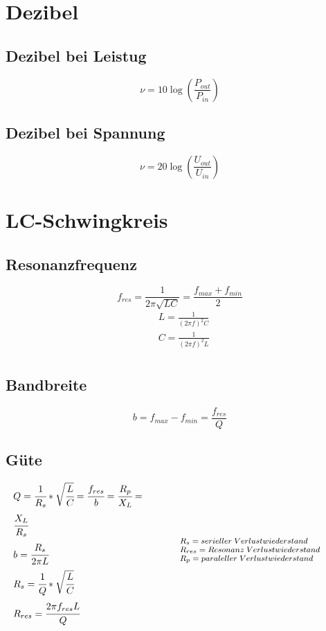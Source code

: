 \documentclass[12pt,a5paper,ngerman,titlepage]{article}
\begin{document}
\section{Dezibel}
\subsection{Dezibel bei Leistug}
$$\nu=10\log{\left(\frac{P_{out}}{P_{in}}\right)}$$
\subsection{Dezibel bei Spannung}
$$\nu=20\log{\left(\frac{U_{out}}{U_{in}}\right)}$$
\newpage
\section{LC-Schwingkreis}
\subsection{Resonanzfrequenz}
$$f_{res} = \frac{1}{2\pi \sqrt{LC}} = \frac{f_{max}+f_{min}}{2}$$
\begin{align*}
&L = \frac{1}{(2\pi f)^2C} \\[5pt]
&C = \frac{1}{(2\pi f)^2L} \\[5pt]
\end{align*}
 
\subsection{Bandbreite}
$$b = f_{max}-f_{min}= \frac{f_{res}}{Q}$$
\subsection{Güte}
\[
\begin{minipage}{.5\linewidth}
	
  $Q = \cfrac{1}{R_{s}}*\sqrt{\cfrac{L}{C}} = \cfrac{f_{res}}{b}= \cfrac{R_{p}}{X_{L}} =$ \\[5pt]
  $ \cfrac{X_{L}}{R_{s}} $ \\[5pt]
  $b = \cfrac{R_{s}}{2\pi L}$\\[5pt]
  $R_{s} = \cfrac{1}{Q}*\sqrt{\cfrac{L}{C}}$\\[5pt]
  $R_{res} = \cfrac{2 \pi f_{res} L}{Q}$

\end{minipage}%
\begin{minipage}{.5\linewidth}
  \fontsize{8pt}{9pt}\selectfont
  $R_{s} = serieller \; Verlustwiederstand $ \\
  $R_{res} = Resonanz \; Verlustwiederstand $ \\
  $R_{p} = paraleller \; Verlustwiederstand $ \\


\end{minipage}
\]
\newpage
\end{document}

